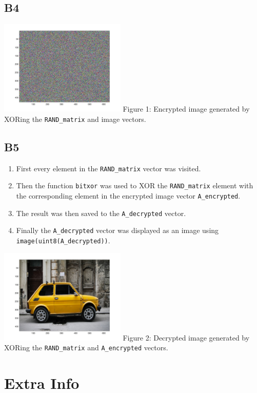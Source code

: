 \documentclass[12pt, letterpaper, titlepage, hidelinks]{article}
\begin{document}
		\subsection{B4}
			\includegraphics[width=0.45\textwidth]{encrypted_image} \newline
			Figure 1: Encrypted image generated by XORing the \verb|RAND_matrix| and image vectors.
		\subsection{B5}
			\begin{enumerate}
				\item First every element in the \verb|RAND_matrix| vector was visited.
				\item Then the function \verb|bitxor| was used to XOR the \verb|RAND_matrix| element with the corresponding element in the encrypted image vector \verb|A_encrypted|.
				\item The result was then saved to the \verb|A_decrypted| vector.
				\item Finally the \verb|A_decrypted| vector was displayed as an image using \verb|image(uint8(A_decrypted))|.
			\end{enumerate}
			\includegraphics[width=0.45\textwidth]{decrypted_image} \newline
			Figure 2: Decrypted image generated by XORing the \verb|RAND_matrix| and \verb|A_encrypted| vectors.
\section{Extra Info}
	
	
	
\end{document}
